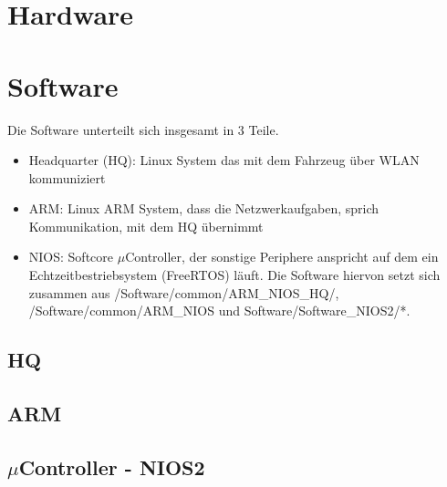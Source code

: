 \chapter{Hardware}

\chapter{Software}
Die Software unterteilt sich insgesamt in 3 Teile.
\begin{itemize}
 \item Headquarter (HQ): Linux System das mit dem Fahrzeug über WLAN kommuniziert
 \item ARM: Linux ARM System, dass die Netzwerkaufgaben, sprich Kommunikation, mit dem HQ übernimmt
 \item NIOS: Softcore $\mu$Controller, der sonstige Periphere anspricht auf dem ein Echtzeitbestriebsystem (FreeRTOS) läuft. Die Software hiervon setzt sich zusammen aus /Software/common/ARM\_NIOS\_HQ/, /Software/common/ARM\_NIOS und Software/Software\_NIOS2/*.
\end{itemize}

\section{HQ}


\section{ARM}



\section{$\mu$Controller - NIOS2}


